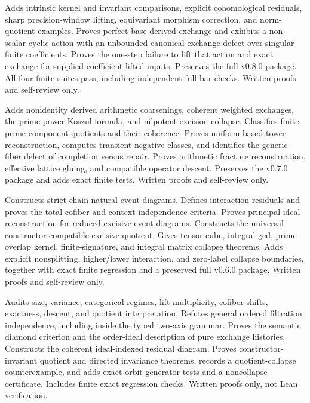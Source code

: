 \documentclass[11pt]{article}
\theoremstyle{definition}
\theoremstyle{remark}
\begin{document}
\begingroup\footnotesize\raggedright
\begin{description}[leftmargin=8em,style=nextline]
\item[v0.9.0] Adds intrinsic kernel and invariant comparisons, explicit cohomological residuals, sharp precision-window lifting, equivariant morphism correction, and norm-quotient examples. Proves perfect-base derived exchange and exhibits a non-scalar cyclic action with an unbounded canonical exchange defect over singular finite coefficients. Proves the one-step failure to lift that action and exact exchange for supplied coefficient-lifted inputs. Preserves the full v0.8.0 package. All four finite suites pass, including independent full-bar checks. Written proofs and self-review only.
\item[v0.8.0] Adds nonidentity derived arithmetic coarsenings, coherent weighted exchanges, the prime-power Koszul formula, and nilpotent excision collapse. Classifies finite prime-component quotients and their coherence. Proves uniform based-tower reconstruction, computes transient negative classes, and identifies the generic-fiber defect of completion versus repair. Proves arithmetic fracture reconstruction, effective lattice gluing, and compatible operator descent. Preserves the v0.7.0 package and adds exact finite tests. Written proofs and self-review only.
\item[v0.7.0] Constructs strict chain-natural event diagrams. Defines interaction residuals and proves the total-cofiber and context-independence criteria. Proves principal-ideal reconstruction for reduced excisive event diagrams. Constructs the universal constructor-compatible excisive quotient. Gives tensor-cube, integral gcd, prime-overlap kernel, finite-signature, and integral matrix collapse theorems. Adds explicit nonsplitting, higher/lower interaction, and zero-label collapse boundaries, together with exact finite regression and a preserved full v0.6.0 package. Written proofs and self-review only.
\item[v0.6.0] Audits size, variance, categorical regimes, lift multiplicity, cofiber shifts, exactness, descent, and quotient interpretation. Refutes general ordered filtration independence, including inside the typed two-axis grammar. Proves the semantic diamond criterion and the order-ideal description of pure exchange histories. Constructs the coherent ideal-indexed residual diagram. Proves constructor-invariant quotient and directed invariance theorems, records a quotient-collapse counterexample, and adds exact orbit-generator tests and a noncollapse certificate. Includes finite exact regression checks. Written proofs only, not Lean verification.

\end{description}
\end{document}
